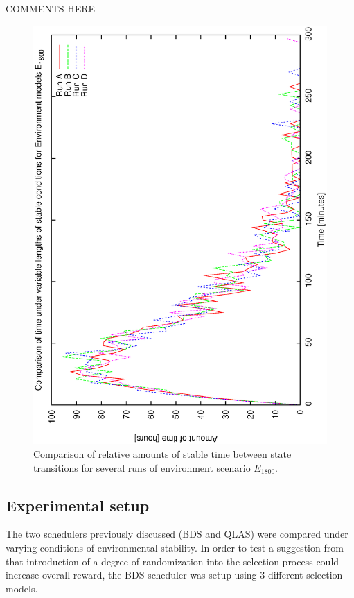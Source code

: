 COMMENTS HERE



\begin{figure}[h]
\begin{center}
 \includegraphics[scale=0.5, angle=-90]{figures/e_18_comp.eps}
 \caption[Comparison of relative amounts of stable time for environment scenario $E_{1800}$.] 
   {Comparison of relative amounts of stable time between state transitions for several runs of environment scenario $E_{1800}$.}
\label{fig:env_comp_18}
\end{center} 
\end{figure}


\subsection{Experimental setup}
\label{sect:ss_exptsetup}
The two schedulers previously discussed (BDS and QLAS) were compared under varying conditions of environmental stability. In order to test a suggestion from \cite{cicirello02amplification} that introduction of a degree of randomization into the selection process could increase overall reward, the BDS scheduler was setup using 3 different selection models. 

